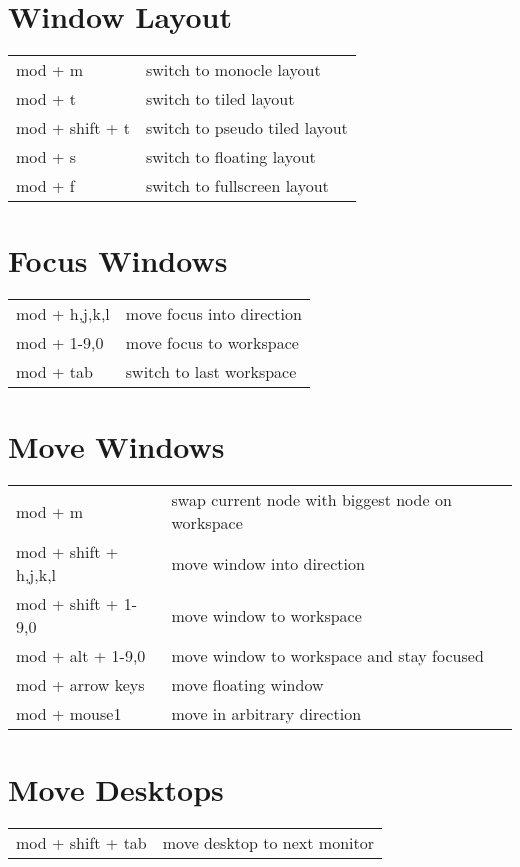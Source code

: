 \documentclass[
    a4paper,
    10pt,
    notitlepage,
    egregdoesnotlikesansseriftitles
]{scrartcl}
\begin{document}
\section{Window Layout}
\begin{tabular}{p{4cm}l}
    mod + m             & switch to monocle layout              \\
    mod + t             & switch to tiled layout                \\
    mod + shift + t     & switch to pseudo tiled layout         \\
    mod + s             & switch to floating layout             \\
    mod + f             & switch to fullscreen layout
\end{tabular}

\section{Focus Windows}
\begin{tabular}{p{4cm}l}
    mod + h,j,k,l         & move focus into direction        \\
    mod + 1-9,0           & move focus to workspace          \\
    mod + tab             & switch to last workspace
\end{tabular}

\section{Move Windows}
\begin{tabular}{p{4cm}l}
    mod + m               & swap current node with biggest node on workspace \\
    mod + shift + h,j,k,l & move window into direction        \\
    mod + shift + 1-9,0   & move window to workspace          \\
    mod + alt + 1-9,0     & move window to workspace and stay focused        \\
    mod + arrow keys      & move floating window              \\
    mod + mouse1          & move in arbitrary direction
\end{tabular}

\section{Move Desktops}
\begin{tabular}{p{4cm}l}
    mod + shift + tab     & move desktop to next monitor
\end{tabular}
\end{document}

